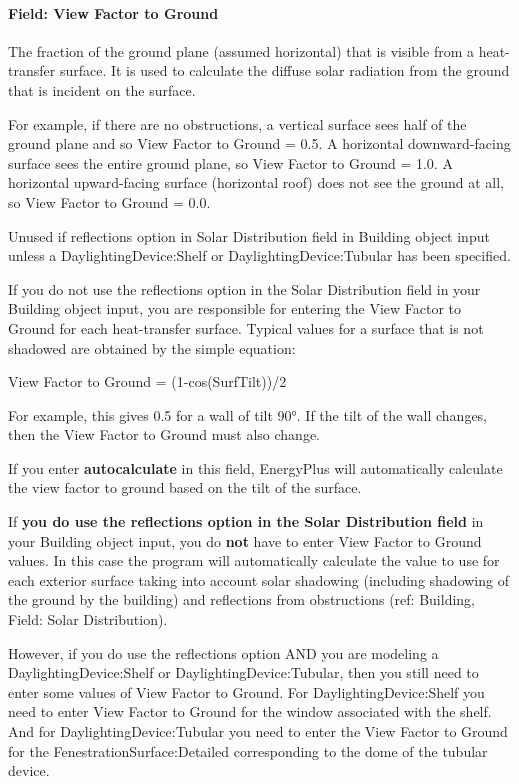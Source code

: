 \paragraph{Field: View Factor to Ground}\label{field-view-factor-to-ground-1}

The fraction of the ground plane (assumed horizontal) that is visible from a heat-transfer surface. It is used to calculate the diffuse solar radiation from the ground that is incident on the surface.

For example, if there are no obstructions, a vertical surface sees half of the ground plane and so View Factor to Ground = 0.5. A horizontal downward-facing surface sees the entire ground plane, so View Factor to Ground = 1.0. A horizontal upward-facing surface (horizontal roof) does not see the ground at all, so View Factor to Ground = 0.0.

Unused if reflections option in Solar Distribution field in Building object input unless a DaylightingDevice:Shelf or DaylightingDevice:Tubular has been specified.

If you do not use the reflections option in the Solar Distribution field in your Building object input, you are responsible for entering the View Factor to Ground for each heat-transfer surface. Typical values for a surface that is not shadowed are obtained by the simple equation:

View Factor to Ground = (1-cos(SurfTilt))/2

For example, this gives 0.5 for a wall of tilt 90°. If the tilt of the wall changes, then the View Factor to Ground must also change.

If you enter \textbf{autocalculate} in this field, EnergyPlus will automatically calculate the view factor to ground based on the tilt of the surface.

If \textbf{you do use the reflections option in the Solar Distribution field} in your Building object input, you do \textbf{not} have to enter View Factor to Ground values. In this case the program will automatically calculate the value to use for each exterior surface taking into account solar shadowing (including shadowing of the ground by the building) and reflections from obstructions (ref: Building, Field: Solar Distribution).

However, if you do use the reflections option AND you are modeling a DaylightingDevice:Shelf or DaylightingDevice:Tubular, then you still need to enter some values of View Factor to Ground. For DaylightingDevice:Shelf you need to enter View Factor to Ground for the window associated with the shelf. And for DaylightingDevice:Tubular you need to enter the View Factor to Ground for the FenestrationSurface:Detailed corresponding to the dome of the tubular device.

